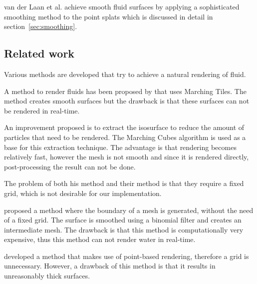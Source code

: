 van der Laan et al. achieve smooth fluid surfaces by applying a sophisticated smoothing method to the point splats which is discussed in detail in section~\ref{sec:smoothing}.

\subsection{Related work}
Various methods are developed that try to achieve a natural rendering of fluid.

A method to render fluids has been proposed by \cite{williams2008fluid} that uses Marching Tiles. 
The method creates smooth surfaces but the drawback is that these surfaces can not be rendered in real-time.

An improvement \cite{rosenberg2008real} proposed is to extract the isosurface to reduce the amount of particles that need to be rendered.
The Marching Cubes algorithm is used as a base for this extraction technique.
The advantage is that rendering becomes relatively fast, however the mesh is not smooth and since it is rendered directly, post-processing the result can not be done.

The problem of both \cite{williams2008fluid} his method and \cite{rosenberg2008real} their method is that they require a fixed grid, which is not desirable for our implementation. 

\cite{muller2007screen} proposed a method where the boundary of a mesh is generated, without the need of a fixed grid.
The surface is smoothed using a binomial filter and creates an intermediate mesh.
The drawback is that this method is computationally very expensive, thus this method can not render water in real-time.

\cite{zhang2008adaptive} developed a method that makes use of point-based rendering, therefore a grid is unnecessary.
However, a drawback of this method is that it results in unreasonably thick surfaces.
